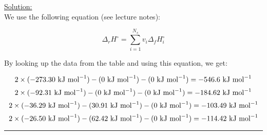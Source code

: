 \noindent
\underline{Solution:}\\

We use the following equation (see lecture notes):

$$\Delta_r H^\circ = \sum\limits_{i=1}^{N_s}v_i\Delta_fH_i^\circ$$

By looking up the data from the table and using this equation, we get:

$$2 \times (-273.30\textnormal{ kJ mol}^{-1}) - (0\textnormal{ kJ mol}^{-1}) - (0\textnormal{ kJ mol}^{-1})= -546.6\textnormal{ kJ mol}^{-1}$$
$$2 \times (-92.31\textnormal{ kJ mol}^{-1}) - (0\textnormal{ kJ mol}^{-1}) - (0\textnormal{ kJ mol}^{-1}) = -184.62\textnormal{ kJ mol}^{-1}$$
$$2 \times (-36.29\textnormal{ kJ mol}^{-1}) - (30.91\textnormal{ kJ mol}^{-1}) - (0\textnormal{ kJ mol}^{-1}) = -103.49\textnormal{ kJ mol}^{-1}$$
$$2 \times (-26.50\textnormal{ kJ mol}^{-1}) - (62.42\textnormal{ kJ mol}^{-1}) - (0\textnormal{ kJ mol}^{-1}) = -114.42\textnormal{ kJ mol}^{-1}$$

\hrule\vspace{0.5cm}
